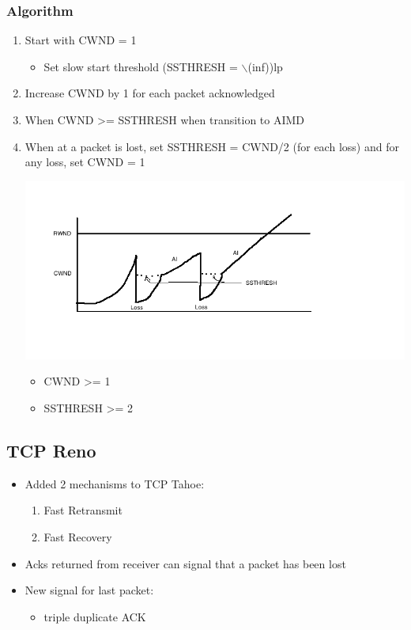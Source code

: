 \documentclass[11pt]{article}
\begin{document}
\subsubsection{Algorithm}
\label{sec:orgheadline139}
\begin{enumerate}
\item Start with CWND = 1
\begin{itemize}
\item Set slow start threshold (SSTHRESH = $\backslash$(inf))lp
\end{itemize}
\item Increase CWND by 1 for each packet acknowledged
\item When CWND >= SSTHRESH when transition to AIMD
\item When at a packet is lost, set SSTHRESH = CWND/2 (for each loss) and
for any loss, set CWND = 1

\includegraphics[width=.9\linewidth]{diagrams/SS_2.png}

\begin{itemize}
\item CWND >= 1
\item SSTHRESH >= 2
\end{itemize}
\end{enumerate}

\subsection{TCP Reno}
\label{sec:orgheadline141}
\begin{itemize}
\item Added 2 mechanisms to TCP Tahoe:
\begin{enumerate}
\item Fast Retransmit
\item Fast Recovery
\end{enumerate}
\item Acks returned from receiver can signal that a packet has been lost
\item New signal for last packet:
\begin{itemize}
\item triple duplicate ACK
\end{itemize}
\end{itemize}
\end{document}

